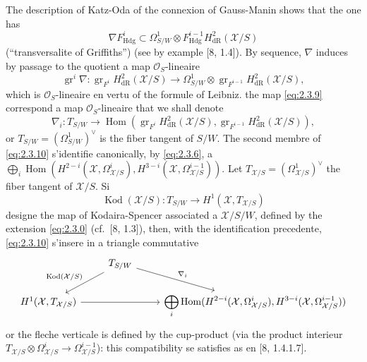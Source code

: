 \documentclass[12pt,a4paper]{article}
\theoremstyle{plain}
\theoremstyle{definition}
\theoremstyle{remark}
\DeclareMathOperator{\Hom}{Hom}
\DeclareMathOperator{\gr}{gr}
\DeclareMathOperator{\Kod}{Kod}
\newcommand{\Hdg}{\mathrm{Hdg}}
\begin{document}
The description of Katz-Oda of the connexion of Gauss-Manin shows that the one has
\begin{equation}\label{eq:2.3.8}
\nabla F^i_{\Hdg} \subset \Omega^1_{S/W} \otimes F^{i-1}_{\Hdg} H^2_{\mathrm{dR}}(\mathcal{X}/S)
\end{equation}
(``transversalite of Griffiths'') (see by example [8, 1.4]). By sequence, $\nabla$ induces by passage to the quotient a map $\mathcal{O}_S$-lineaire
\begin{equation}\label{eq:2.3.9}
\gr^i \nabla: \gr_{F^i} H^2_{\mathrm{dR}}(\mathcal{X}/S) \to \Omega^1_{S/W} \otimes \gr_{F^{i-1}} H^2_{\mathrm{dR}}(\mathcal{X}/S),
\end{equation}
which is $\mathcal{O}_S$-lineaire en vertu of the formule of Leibniz. the map \eqref{eq:2.3.9} correspond a map $\mathcal{O}_S$-lineaire that we shall denote
\begin{equation}\label{eq:2.3.10}
\nabla_i: T_{S/W} \to \Hom(\gr_{F^i} H^2_{\mathrm{dR}}(\mathcal{X}/S), \gr_{F^{i-1}} H^2_{\mathrm{dR}}(\mathcal{X}/S)),
\end{equation}
or $T_{S/W} = (\Omega^1_{S/W})^{\vee}$ is the fiber tangent of $S/W$. The second membre of \eqref{eq:2.3.10} s'identifie canonically, by \eqref{eq:2.3.6}, a $\bigoplus_i \Hom(H^{2-i}(\mathcal{X}, \Omega^i_{\mathcal{X}/S}), H^{3-i}(\mathcal{X}, \Omega^{i-1}_{\mathcal{X}/S}))$. Let $T_{\mathcal{X}/S} = (\Omega^1_{\mathcal{X}/S})^{\vee}$ the fiber tangent of $\mathcal{X}/S$. Si
\begin{equation}\label{eq:2.3.11}
\Kod(\mathcal{X}/S): T_{S/W} \to H^1(\mathcal{X}, T_{\mathcal{X}/S})
\end{equation}
designe the map of Kodaira-Spencer associated a $\mathcal{X}/S/W$, defined by the extension \eqref{eq:2.3.0} (cf.~[8, 1.3]), then, with the identification precedente, \eqref{eq:2.3.10} s'insere in a triangle commutative
\begin{equation}\label{eq:2.3.12}
\begin{tikzcd}
& T_{S/W} \arrow[dl, "{\Kod(\mathcal{X}/S)}"'] \arrow[dr, "{\nabla_i}"] & \\
H^1(\mathcal{X}, T_{\mathcal{X}/S}) \arrow[rr] & & \displaystyle\bigoplus_i \Hom(H^{2-i}(\mathcal{X}, \Omega^i_{\mathcal{X}/S}), H^{3-i}(\mathcal{X}, \Omega^{i-1}_{\mathcal{X}/S}))
\end{tikzcd}
\end{equation}
or the fleche verticale is defined by the cup-product (via the product interieur $T_{\mathcal{X}/S} \otimes \Omega^i_{\mathcal{X}/S} \to \Omega^{i-1}_{\mathcal{X}/S}$): this compatibility se satisfies as en [8, 1.4.1.7].
\end{document}
